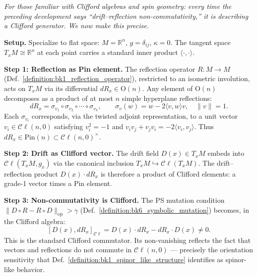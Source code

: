 \begin{scholium}
\label{scholium:bk4_clifford_correspondence}
\emph{For those familiar with Clifford algebras and spin geometry: every time
the preceding development says ``drift--reflection non-commutativity,'' it is
describing a Clifford generator. We now make this precise.}

\medskip\noindent\textbf{Setup.}
Specialize to flat space: $M = \mathbb{R}^n$, $g = \delta_{ij}$, $\kappa = 0$.
The tangent space $T_xM \cong \mathbb{R}^n$ at each point carries a standard
inner product $\langle \cdot, \cdot \rangle$.

\medskip\noindent\textbf{Step 1: Reflection as Pin element.}
The reflection operator $R: M \to M$
(Def.~\ref{definition:bk1_reflection_operator}), restricted to an isometric
involution, acts on $T_xM$ via its differential $dR_x \in \mathrm{O}(n)$.
Any element of $\mathrm{O}(n)$ decomposes as a product of at most $n$ simple
hyperplane reflections:
\[
dR_x = \sigma_{v_1} \circ \sigma_{v_2} \circ \cdots \circ \sigma_{v_k},
\qquad \sigma_v(w) = w - 2\langle v, w\rangle v, \quad \|v\| = 1.
\]
Each $\sigma_{v_i}$ corresponds, via the twisted adjoint representation, to
a unit vector $v_i \in \mathcal{C}\ell(n,0)$ satisfying
$v_i^2 = -1$ and $v_i v_j + v_j v_i = -2\langle v_i, v_j \rangle$.
Thus $dR_x \in \mathrm{Pin}(n) \subset \mathcal{C}\ell(n,0)^{\times}$.

\medskip\noindent\textbf{Step 2: Drift as Clifford vector.}
The drift field $D(x) \in T_xM$ embeds into $\mathcal{C}\ell(T_xM, g_x)$
via the canonical inclusion $T_xM \hookrightarrow \mathcal{C}\ell(T_xM)$.
The drift--reflection product $D(x) \cdot dR_x$ is therefore a product of
Clifford elements: a grade-1 vector times a Pin element.

\medskip\noindent\textbf{Step 3: Non-commutativity is Clifford.}
The PS mutation condition
$\|D \circ R - R \circ D\|_{\mathrm{op}} > \gamma$
(Def.~\ref{definition:bk6_symbolic_mutation}) becomes, in the Clifford algebra:
\[
[D(x), dR_x]_{\mathcal{C}\ell} = D(x) \cdot dR_x - dR_x \cdot D(x) \neq 0.
\]
This is the standard Clifford commutator. Its non-vanishing reflects the
fact that vectors and reflections do not commute in $\mathcal{C}\ell(n,0)$
--- precisely the orientation sensitivity that
Def.~\ref{definition:bk1_spinor_like_structure} identifies as spinor-like
behavior.


\end{scholium}

